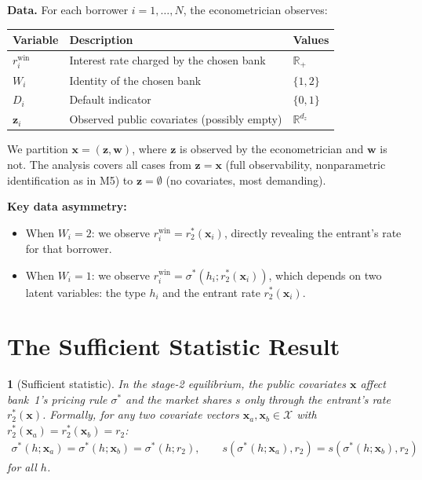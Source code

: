 \documentclass[12pt]{article}
\theoremstyle{plain}
\theoremstyle{plain}
\newtheorem{prop}[thm]{\protect\propositionname}
\theoremstyle{definition}  %
\theoremstyle{remark}  %
\providecommand{\propositionname}{Proposition}
\begin{document}
\medskip\noindent
\textbf{Data.} For each borrower $i = 1, \ldots, N$, the econometrician observes:
\begin{center}
\renewcommand{\arraystretch}{1.3}
\begin{tabular}{lll}
\toprule
\textbf{Variable} & \textbf{Description} & \textbf{Values} \\
\midrule
$r_i^{\text{win}}$ & Interest rate charged by the chosen bank & $\mathbb{R}_+$ \\
$W_i$ & Identity of the chosen bank & $\{1, 2\}$ \\
$D_i$ & Default indicator & $\{0, 1\}$ \\
$\mathbf{z}_i$ & Observed public covariates (possibly empty) & $\mathbb{R}^{d_z}$ \\
\bottomrule
\end{tabular}
\end{center}
We partition $\mathbf{x} = (\mathbf{z}, \mathbf{w})$, where $\mathbf{z}$ is observed by the econometrician and $\mathbf{w}$ is not. The analysis covers all cases from $\mathbf{z} = \mathbf{x}$ (full observability, nonparametric identification as in M5) to $\mathbf{z} = \emptyset$ (no covariates, most demanding).

\medskip\noindent
\textbf{Key data asymmetry:}
\begin{itemize}
    \item When $W_i = 2$: we observe $r_i^{\text{win}} = r_2^*(\mathbf{x}_i)$, directly revealing the entrant's rate for that borrower.
    \item When $W_i = 1$: we observe $r_i^{\text{win}} = \sigma^*(h_i; r_2^*(\mathbf{x}_i))$, which depends on two latent variables: the type $h_i$ and the entrant rate $r_2^*(\mathbf{x}_i)$.
\end{itemize}



\newpage
\section{The Sufficient Statistic Result}\label{sec:suffstat}

\begin{prop}[Sufficient statistic]\label{prop:suffstat}
In the stage-2 equilibrium, the public covariates $\mathbf{x}$ affect bank~1's pricing rule $\sigma^*$ and the market shares $s$ only through the entrant's rate $r_2^*(\mathbf{x})$. Formally, for any two covariate vectors $\mathbf{x}_a, \mathbf{x}_b \in \mathcal{X}$ with $r_2^*(\mathbf{x}_a) = r_2^*(\mathbf{x}_b) = r_2$:
\begin{align}\label{eq:suffstat}
    \sigma^*(h; \mathbf{x}_a) = \sigma^*(h; \mathbf{x}_b) = \sigma^*(h; r_2), \qquad s(\sigma^*(h; \mathbf{x}_a), r_2) = s(\sigma^*(h; \mathbf{x}_b), r_2)
\end{align}
for all $h$.
\end{prop}
\end{document}
